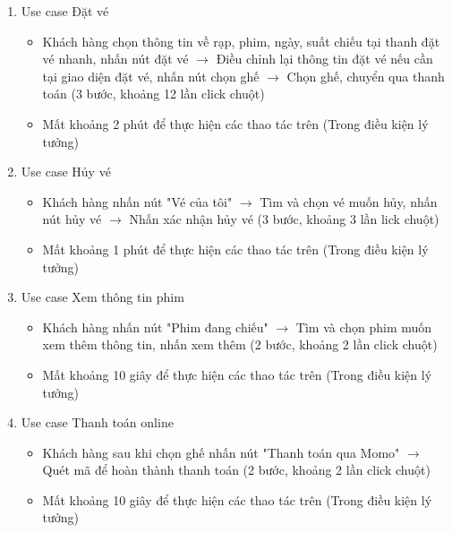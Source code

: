 \documentclass[a4paper, 12pt]{article}
\begin{document}
\begin{enumerate}
        \item Use case Đặt vé
        \begin{itemize}
            \item Khách hàng chọn thông tin về rạp, phim, ngày, suất chiếu tại thanh đặt vé nhanh, nhấn nút đặt vé $\rightarrow$ Điều chỉnh lại thông tin đặt vé nếu cần tại giao diện đặt vé, nhấn nút chọn ghế  $\rightarrow$ Chọn ghế, chuyển qua thanh toán (3 bước, khoảng 12 lần click chuột)
            \item Mất khoảng 2 phút để thực hiện các thao tác trên (Trong điều kiện lý tưởng)
        \end{itemize}

        \item Use case Hủy vé
        \begin{itemize}
            \item Khách hàng nhấn nút "Vé của tôi"  $\rightarrow$ Tìm và chọn vé muốn hủy, nhấn nút hủy vé $\rightarrow$ Nhấn xác nhận hủy vé (3 bước, khoảng 3 lần lick chuột)
            \item Mất khoảng 1 phút để thực hiện các thao tác trên (Trong điều kiện lý tưởng)
        \end{itemize}

        \item Use case Xem thông tin phim
        \begin{itemize}
            \item Khách hàng nhấn nút "Phim đang chiếu"  $\rightarrow$ Tìm và chọn phim muốn xem thêm thông tin, nhấn xem thêm (2 bước, khoảng 2 lần click chuột)
            \item Mất khoảng 10 giây để thực hiện các thao tác trên (Trong điều kiện lý tưởng)
        \end{itemize}

        \item Use case Thanh toán online
        \begin{itemize}
            \item Khách hàng sau khi chọn ghế nhấn nút "Thanh toán qua Momo" $\rightarrow$ Quét mã để hoàn thành thanh toán (2 bước, khoảng 2 lần click chuột)
            \item Mất khoảng 10 giây để thực hiện các thao tác trên (Trong điều kiện lý tưởng)
        \end{itemize}


\end{enumerate}
\end{document}
